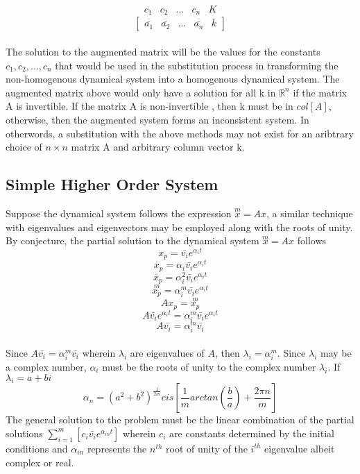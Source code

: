 \documentclass[a4paper, 12pt]{report}
\def\a{\alpha}
\def\la{\lambda}
\def\f{\frac}
\def\l{\left}
\def\r{\right}
\def\dst{\displaystyle}
\def\b{\bar}
\begin{document}
\begin{center}
$$\begin{matrix}c_1 & c_2 & \dots & c_n& K \end{matrix}$$
$$\begin{bmatrix} \b{a_1} & \b{a_2} & \dots &\b{a_n} &k \end{bmatrix}$$
\\The solution to the augmented matrix will be the values for the constants $c_1,c_2,\dots,c_n$ that would be used in the substitution process in transforming the non-homogenous dynamical system into a homogenous dynamical system. The augmented matrix above would only have a solution for all k in $\mathbb{R}^{n}$ if the matrix A is invertible. If the matrix A is non-invertible , then k must be in $col[A]$, otherwise, then the augmented system forms an inconsistent system. In otherwords, a substitution with the above methods may not exist for an aribtrary choice of $n\times n$ matrix A and arbitrary column vector k. 
\subsection{Simple Higher Order System}
Suppose the dynamical system follows the expression $\dst{\overset{m}{x} = Ax}$, a similar technique with eigenvalues and eigenvectors may be employed along with the roots of unity. By conjecture, the partial solution to the dynamical system $\dst{\overset{m}{x} = Ax}$ follows
$$x_p = \b{v_i}e^{\a_i t}$$
$$\dot{x_p} = \a_i\b{v_i}e^{\a_i t}$$
$$\ddot{x_p} = \a_i^2\b{v_i}e^{\a_i t}$$
$$\overset{m}{x_p} = \a_i^m\b{v_i}e^{\a_i t}$$
$$Ax_p = \overset{m}{x_p}$$
$$A \b{v_i}e^{\a_i t}= \a_i^m\b{v_i}e^{\a_i t}$$
$$A \b{v_i}= \a_i^m\b{v_i}$$
\\Since $\dst{A \b{v_i}= \a_i^m\b{v_i}}$ wherein $\dst{\la_i}$ are eigenvalues of $A$, then $\la_i = \a_i^m$. Since $\la_i$ may be a complex number, $\a_i$ must be the roots of unity to the complex number $\la_i$. If $\la_i = a+bi$
$$\a_n = (a^2 + b^2)^{\f{1}{2m}}cis\l[\f{1}{m}arctan\l(\f{b}{a}\r) + \f{2 \pi n}{m}\r]$$
The general solution to the problem must be the linear combination of the partial solutions $\dst{\sum_{i = 1}^m\l[c_i\b{v_i}e^{\a_{in} t}\r]}$ wherein $c_i$ are constants determined by the initial conditions and $\a_{in}$ represents the $n^{th}$ root of unity of the $i^{th}$ eigenvalue albeit complex or real. 

\end{center}
\end{document}
